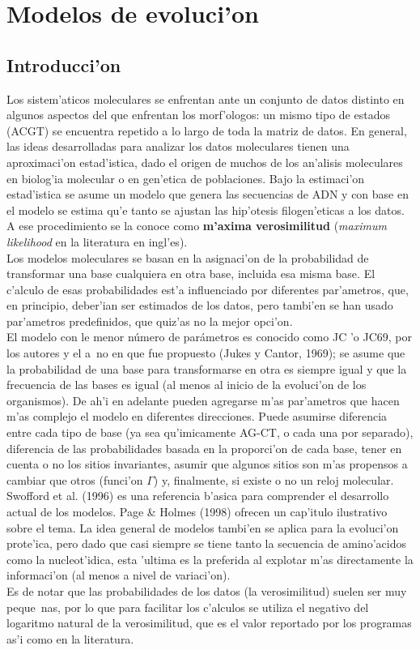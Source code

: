 \chapter{Modelos de evoluci'on}
\section*{Introducci'on}
\label{ch:molecular}
Los sistem'aticos moleculares se enfrentan ante un conjunto de datos distinto en algunos aspectos del que enfrentan los morf'ologos:  un mismo tipo de estados (ACGT) se encuentra repetido a lo largo de toda la matriz de datos. En general, las ideas desarrolladas para analizar los datos moleculares tienen una aproximaci'on estad'istica, dado el origen de muchos de los an'alisis moleculares en biolog'ia molecular o en gen'etica de poblaciones. Bajo la estimaci'on estad'istica se asume un modelo que genera las secuencias de ADN y con base en el modelo se estima qu'e tanto se ajustan las hip'otesis filogen'eticas a los datos. A ese procedimiento se la conoce como \textbf{m'axima verosimilitud} (\textit{maximum likelihood} en la literatura en ingl'es).\\
Los modelos moleculares se basan en la asignaci'on de la probabilidad de transformar una base cualquiera en otra base, incluida esa misma base. El c'alculo de esas probabilidades est'a influenciado por diferentes par'ametros, que, en principio, deber'ian ser estimados de los datos, pero tambi'en se han usado par'ametros predefinidos, que quiz'as no la mejor opci'on.\\
El modelo con le menor n\'umero de par\'ametros es conocido como JC 'o JC69, por los autores y el a~no en que fue propuesto (Jukes y Cantor, 1969); se asume que la probabilidad de una base para transformarse en otra es siempre igual y que la frecuencia de las bases es igual (al menos al inicio de la evoluci'on de los organismos). De ah'i en adelante pueden agregarse m'as par'ametros que hacen m'as complejo el modelo en diferentes direcciones. Puede asumirse diferencia entre cada tipo de base (ya sea qu'imicamente AG-CT, o cada una por separado), diferencia de las probabilidades basada en la proporci'on de cada base, tener en cuenta o no los sitios invariantes, asumir que algunos sitios son m'as propensos a cambiar que otros (funci'on $\Gamma$) y, finalmente, si existe o no un reloj molecular.\\
Swofford et al. (1996) es una referencia b'asica para comprender el desarrollo actual de los modelos. Page \& Holmes (1998) ofrecen un cap'itulo ilustrativo sobre el tema. La idea general de modelos tambi'en se aplica para la evoluci'on prote'ica, pero dado que casi siempre se tiene tanto la secuencia de amino'acidos como la nucleot'idica, esta 'ultima es la preferida al explotar m'as directamente la informaci'on (al menos a nivel de variaci'on).\\
Es de notar que las probabilidades de los datos (la verosimilitud) suelen ser muy peque~nas, por lo que para facilitar los c'alculos se utiliza el negativo del logaritmo natural de la verosimilitud, que es el valor reportado por los programas as'i como en la literatura.
